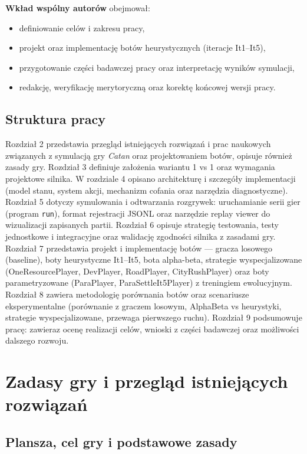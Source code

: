 \documentclass[polish,inz,longabstract]{iithesis}
\begin{document}
\textbf{Wkład wspólny autorów} obejmował:
\begin{itemize}
\item definiowanie celów i zakresu pracy,
\item projekt oraz implementację botów heurystycznych (iteracje It1--It5),
\item przygotowanie części badawczej pracy oraz interpretację wyników symulacji,
\item redakcję, weryfikację merytoryczną oraz korektę końcowej wersji pracy.
\end{itemize}

\section{Struktura pracy}

Rozdział 2 przedstawia przegląd istniejących rozwiązań i prac naukowych związanych z symulacją gry \textit{Catan} oraz projektowaniem botów, opisuje również zasady gry. Rozdział 3 definiuje założenia wariantu 1 vs 1 oraz wymagania projektowe silnika. W rozdziale 4 opisano architekturę i szczegóły implementacji (model stanu, system akcji, mechanizm cofania oraz narzędzia diagnostyczne). Rozdział 5 dotyczy symulowania i odtwarzania rozgrywek: uruchamianie serii gier (program \texttt{run}), format rejestracji JSONL oraz narzędzie replay viewer do wizualizacji zapisanych partii. Rozdział 6 opisuje strategię testowania, testy jednostkowe i integracyjne oraz walidację zgodności silnika z zasadami gry. Rozdział 7 przedstawia projekt i implementację botów --- gracza losowego (baseline), boty heurystyczne It1--It5, bota alpha-beta, strategie wyspecjalizowane (OneResourcePlayer, DevPlayer, RoadPlayer, CityRushPlayer) oraz boty parametryzowane (ParaPlayer, ParaSettleIt5Player) z treningiem ewolucyjnym. Rozdział 8 zawiera metodologię porównania botów oraz scenariusze eksperymentalne (porównanie z graczem losowym, AlphaBeta vs heurystyki, strategie wyspecjalizowane, przewaga pierwszego ruchu). Rozdział 9 podsumowuje pracę: zawieraz ocenę realizacji celów, wnioski z części badawczej oraz możliwości dalszego rozwoju.

\chapter{Zadasy gry i przegląd istniejących rozwiązań}

\section{Plansza, cel gry i podstawowe zasady}
\end{document}
